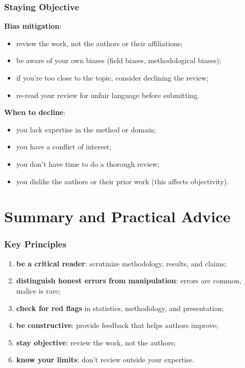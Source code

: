 \documentclass[]{beamer}
\begin{document}
\begin{frame}[fragile]
\frametitle{Staying Objective}
\textbf{Bias mitigation}:
\begin{itemize}
  \item review the work, not the authors or their affiliations;
  \item be aware of your own biases (field biases, methodological biases);
  \item if you're too close to the topic, consider declining the review;
  \item re-read your review for unfair language before submitting.
\end{itemize}

\textbf{When to decline}:
\begin{itemize}
  \item you lack expertise in the method or domain;
  \item you have a conflict of interest;
  \item you don't have time to do a thorough review;
  \item you dislike the authors or their prior work (this affects objectivity).
\end{itemize}

\end{frame}

\section{Summary and Practical Advice}

\begin{frame}[fragile]
\frametitle{Key Principles}
\begin{enumerate}
  \item \textbf{be a critical reader}: scrutinize methodology, results, and claims;
  \item \textbf{distinguish honest errors from manipulation}: errors are common, malice is rare;
  \item \textbf{check for red flags} in statistics, methodology, and presentation;
  \item \textbf{be constructive}: provide feedback that helps authors improve;
  \item \textbf{stay objective}: review the work, not the authors;
  \item \textbf{know your limits}: don't review outside your expertise.
\end{enumerate}

\end{frame}
\end{document}
